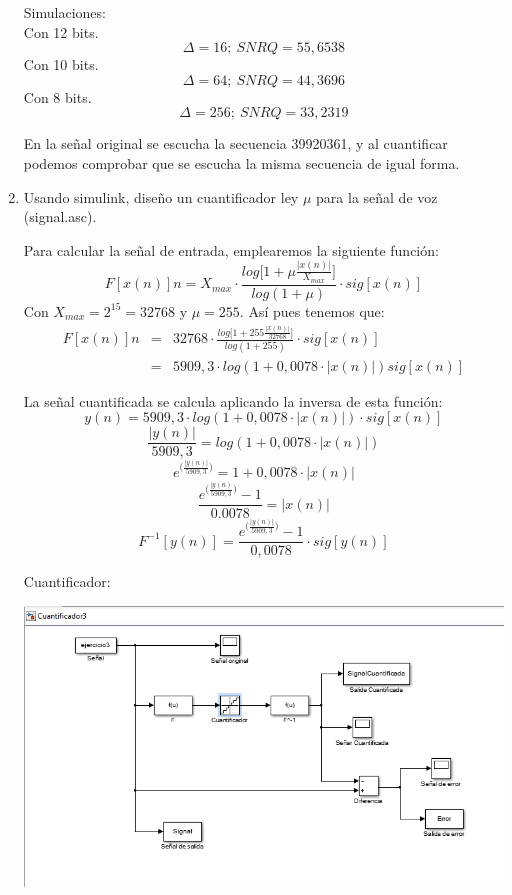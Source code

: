 \documentclass[a4paper,12pt]{article}
\begin{document}
\begin{enumerate}
Simulaciones:\\
Con 12 bits.
$$\Delta = 16;\ SNRQ = 55,6538$$
Con 10 bits.
$$\Delta = 64;\ SNRQ = 44,3696$$
Con 8 bits.
$$\Delta = 256;\ SNRQ = 33,2319$$

En la señal original se escucha la secuencia 39920361, y al cuantificar podemos comprobar que se escucha la misma secuencia de igual forma.

\item Usando simulink, diseño un cuantificador ley $\mu$ para la señal de voz (signal.asc).

Para calcular la señal de entrada, emplearemos la siguiente función:
$$F[x(n)] n = X_{max} \cdot \frac{log \bigl[ 1 + \mu \frac{|x(n)|}{X_{max}}\bigl]}{log(1 + \mu)} \cdot sig[x(n)]$$
Con $X_{max} = 2^{15} = 32768$ y $\mu = 255$. Así pues tenemos que:
\begin{eqnarray*}
F[x(n)] n & = & 32768 \cdot \frac{log \bigl[ 1 + 255 \frac{|x(n)|}{32768}\bigl]}{log(1 + 255)} \cdot sig[x(n)] \\ & = & 5909,3 \cdot log(1 + 0,0078 \cdot |x(n)|) sig[x(n)] 
\end{eqnarray*}

La señal cuantificada se calcula aplicando la inversa de esta función:
$$ y(n) = 5909,3 \cdot log(1 + 0,0078 \cdot |x(n)|) \cdot sig[x(n)] $$
$$ \frac{|y(n)|}{5909,3} = log(1 + 0,0078 \cdot |x(n)|) $$
$$ e^{\bigl( \frac{|y(n)|}{5909,3} \bigl)} = 1 + 0,0078 \cdot |x(n)| $$
$$ \frac{e^{\bigl( \frac{|y(n)}{5909,3} \bigl)} - 1}{0.0078} = |x(n)| $$
$$ F^{-1} [y(n)] = \frac{e^{\bigl( \frac{|y(n)|}{5909,3} \bigl)} - 1}{0,0078} \cdot sig[y(n)] $$

Cuantificador: \\

\begin{center}
\includegraphics[width=.9 \textwidth]{Cuantificador-3.png}\\
\end{center}


\end{enumerate}
\end{document}
